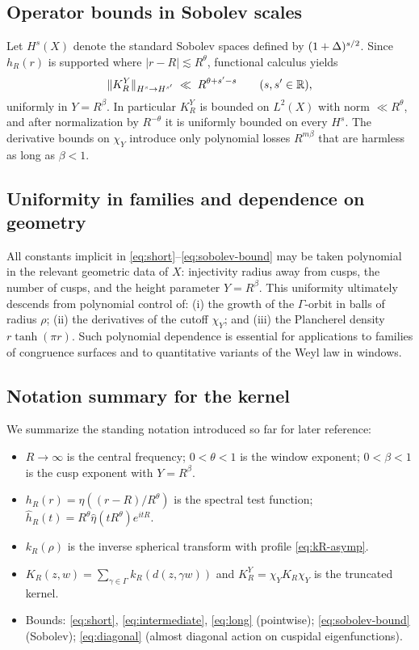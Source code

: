 \subsection{Operator bounds in Sobolev scales}\label{subsec:sobolev}
Let $H^s(X)$ denote the standard Sobolev spaces defined by $(1+\Delta)^{s/2}$. Since $h_R(r)$ is supported where $|r-R|\lesssim R^\theta$, functional calculus yields
\begin{equation}\label{eq:sobolev-bound}
\|K_R^Y\|_{H^s\to H^{s'}} \;\ll\; R^{\theta+s'-s} \qquad (s,s'\in\mathbb{R}),
\end{equation}
uniformly in $Y=R^\beta$. In particular $K_R^Y$ is bounded on $L^2(X)$ with norm $\ll R^\theta$, and after normalization by $R^{-\theta}$ it is uniformly bounded on every $H^s$. The derivative bounds on $\chi_Y$ introduce only polynomial losses $R^{m\beta}$ that are harmless as long as $\beta<1$.

\subsection{Uniformity in families and dependence on geometry}\label{subsec:uniformity}
All constants implicit in \eqref{eq:short}–\eqref{eq:sobolev-bound} may be taken polynomial in the relevant geometric data of $X$: injectivity radius away from cusps, the number of cusps, and the height parameter $Y=R^\beta$. This uniformity ultimately descends from polynomial control of: (i) the growth of the $\Gamma$-orbit in balls of radius $\rho$; (ii) the derivatives of the cutoff $\chi_Y$; and (iii) the Plancherel density $r\tanh(\pi r)$. Such polynomial dependence is essential for applications to families of congruence surfaces and to quantitative variants of the Weyl law in windows.

\subsection{Notation summary for the kernel}\label{subsec:notation}
We summarize the standing notation introduced so far for later reference:
\begin{itemize}
\item $R\to\infty$ is the central frequency; $0<\theta<1$ is the window exponent; $0<\beta<1$ is the cusp exponent with $Y=R^\beta$.
\item $h_R(r)=\eta((r-R)/R^\theta)$ is the spectral test function; $\widehat{h}_R(t)=R^\theta \widehat{\eta}(tR^\theta)e^{itR}$.
\item $k_R(\rho)$ is the inverse spherical transform with profile \eqref{eq:kR-asymp}.
\item $K_R(z,w)=\sum_{\gamma\in\Gamma} k_R(d(z,\gamma w))$ and $K_R^Y=\chi_Y K_R \chi_Y$ is the truncated kernel.
\item Bounds: \eqref{eq:short}, \eqref{eq:intermediate}, \eqref{eq:long} (pointwise); \eqref{eq:sobolev-bound} (Sobolev); \eqref{eq:diagonal} (almost diagonal action on cuspidal eigenfunctions).
\end{itemize}

